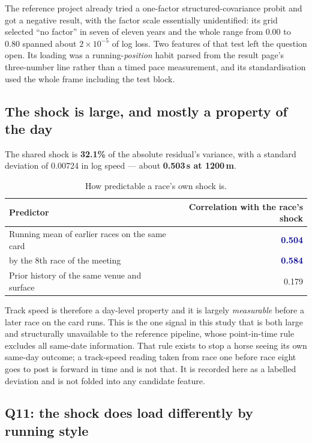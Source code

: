 \documentclass[11pt,a4paper]{article}
\newcommand{\good}[1]{\textcolor{darkblue}{\textbf{#1}}}
\begin{document}
The reference project already tried a one-factor structured-covariance probit and
got a negative result, with the factor scale essentially unidentified: its grid
selected ``no factor'' in seven of eleven years and the whole range from 0.00 to
0.80 spanned about $2\times10^{-5}$ of log loss. Two features of that test left the
question open. Its loading was a running-\emph{position} habit parsed from the
result page's three-number line rather than a timed pace measurement, and its
standardisation used the whole frame including the test block.

\subsection{The shock is large, and mostly a property of the day}

The shared shock is \textbf{32.1\%} of the absolute residual's variance, with a
standard deviation of 0.00724 in log speed --- about \textbf{0.503\,s at 1200\,m}.

\begin{table}[htbp]\centering\small
\caption{How predictable a race's own shock is.}
\begin{tabular}{lr}
\toprule
Predictor & Correlation with the race's shock\\
\midrule
Running mean of earlier races on the same card & \good{0.504}\\
\quad by the 8th race of the meeting & \good{0.584}\\
Prior history of the same venue and surface & 0.179\\
\bottomrule
\end{tabular}
\end{table}

Track speed is therefore a day-level property and it is largely \emph{measurable}
before a later race on the card runs. This is the one signal in this study that is
both large and structurally unavailable to the reference pipeline, whose
point-in-time rule excludes all same-date information. That rule exists to stop a
horse seeing its own same-day outcome; a track-speed reading taken from race one
before race eight goes to post is forward in time and is not that. It is recorded
here as a labelled deviation and is not folded into any candidate feature.

\subsection{Q11: the shock does load differently by running style}
\end{document}
